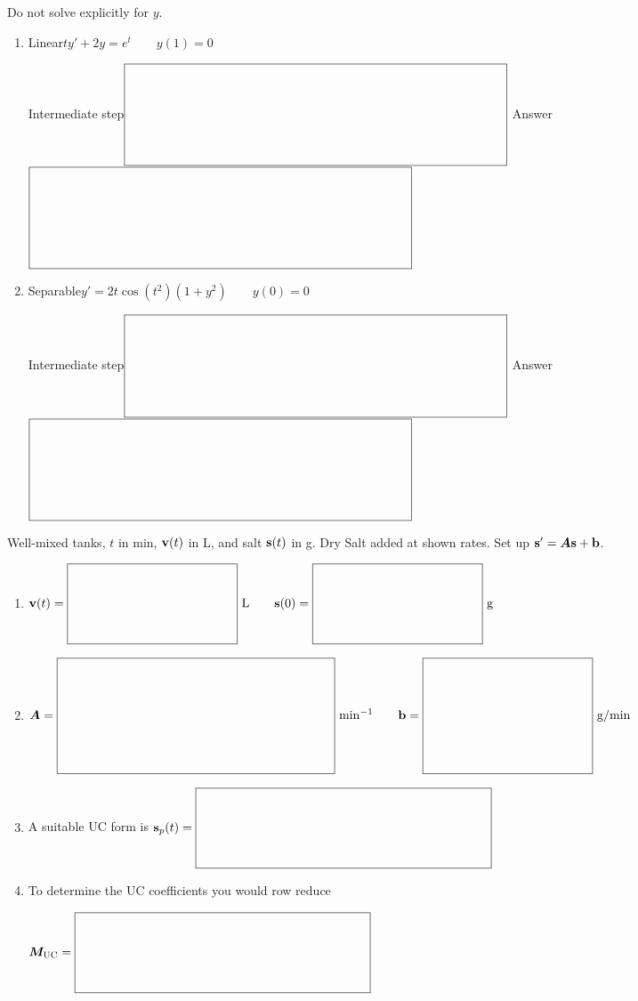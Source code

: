 \documentclass[11pt,letterpaper]{article}
\newcommand{\mat}[1]{\bm{#1}}
\newcommand{\SystemBlank}[2]{%
  \vcenter{\hbox{$\boxed{\rule{0pt}{#2}\makebox[#1]{}}$}}}
\newcommand{\VectorBlank}{\SystemBlank{4.16in}{1.04in}}
\begin{document}
Do not solve explicitly for $y$.
\begin{enumerate}
\item Linear\qquad $ty'+2y=e^t\qquad y(1)=0$
\par Intermediate step\quad $\VectorBlank$
\vfill
\noindent Answer\quad $\VectorBlank$
\item Separable\qquad $y'=2t\cos(t^2)(1+y^2)\qquad y(0)=0$
\par Intermediate step\quad $\VectorBlank$
\vfill
\noindent Answer\quad $\VectorBlank$
\end{enumerate}
\newpage
\noindent{}
\par Well-mixed tanks, $t$ in min, $\mathbf{v}(t)$ in L, and salt $\mathbf{s}(t)$ in g. Dry Salt added at shown rates.
Set up $\vect{s}'=\mat{A}\vect{s}+\vect{b}$.
\begin{enumerate}
\item $\vect{v}(t)=\SystemBlank{1.8in}{0.8in}\ \mathrm{L}\qquad
\vect{s}(0)=\SystemBlank{1.8in}{0.8in}\ \mathrm{g}$
\item $\mat{A}=\SystemBlank{3.0in}{1.2in}\ \mathrm{min}^{-1}\qquad
\vect{b}=\SystemBlank{1.8in}{1.2in}\ \mathrm{g/min}$
\item A suitable UC form is $\vect{s}_p(t)=\SystemBlank{3.2in}{0.8in}$
\item To determine the UC coefficients you would row reduce
\par $\mat{M}_{\mathrm{UC}}=\SystemBlank{3.2in}{0.8in}$
\end{enumerate}
\end{document}
